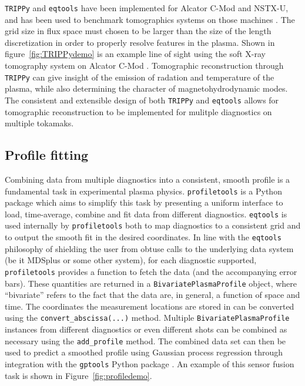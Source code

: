 \documentclass[12pt,floatfix,showpacs]{revtex4-1}
\newcommand{\eqtools}{\texttt{eqtools}\xspace}
\newcommand{\profiletools}{\texttt{profiletools}\xspace}
\newcommand{\TRIPPy}{\texttt{TRIPPy}\xspace}
\newcommand{\gptools}{\texttt{gptools}\xspace}
\begin{document}
\TRIPPy and \eqtools have been implemented for Alcator C-Mod and NSTX-U, and has been used to benchmark tomographics systems on those machines \cite{Faust2014}. 
The grid size in flux space must chosen to be larger than the size of the length discretization in order to properly resolve features in the plasma.
Shown in figure~\ref{fig:TRIPPydemo} is an example line of sight using the soft X-ray tomography system on Alcator C-Mod \cite{Granetz1991}.
Tomographic reconstruction through \TRIPPy can give insight of the emission of radation and temperature of the plasma, while also determining the character of magnetohydrodynamic modes.
The consistent and extensible design of both \TRIPPy and \eqtools allows for tomographic reconstruction to be implemented for mulitple diagnostics on multiple tokamaks.


\subsection{Profile fitting}
Combining data from multiple diagnostics into a consistent, smooth profile is a fundamental task in experimental plasma physics.
\profiletools \cite{profiletools_git,*profiletools_readthedocs} is a Python package which aims to simplify this task by presenting a uniform interface to load, time-average, combine and fit data from different diagnostics.
\eqtools is used internally by \profiletools both to map diagnostics to a consistent grid and to output the smooth fit in the desired coordinates.
In line with the \eqtools philosophy of shielding the user from obtuse calls to the underlying data system (be it MDSplus or some other system), for each diagnostic supported, \profiletools provides a function to fetch the data (and the accompanying error bars).
These quantities are returned in a \verb|BivariatePlasmaProfile| object, where ``bivariate'' refers to the fact that the data are, in general, a function of space and time.
The coordinates the measurement locations are stored in can be converted using the \verb|convert_abscissa(...)| method.
Multiple \verb|BivariatePlasmaProfile| instances from different diagnostics or even different shots can be combined as necessary using the \verb|add_profile| method.
The combined data set can then be used to predict a smoothed profile using Gaussian process regression \cite{gpr_nf} through integration with the \gptools Python package \cite{gptools_git,*gptools_readthedocs}.
An example of this sensor fusion task is shown in Figure~\ref{fig:profiledemo}.
\end{document}
